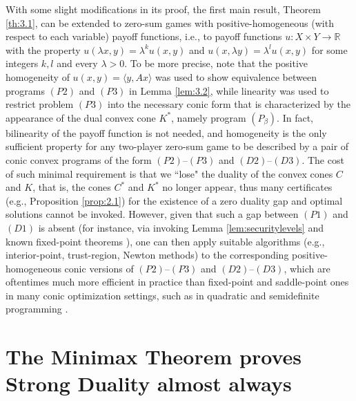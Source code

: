 \documentclass[11pt, twoside]{article}
\numberwithin{equation}{section}
\theoremstyle{definition}
\begin{document}
  With some slight modifications in its proof, the first main result, Theorem \ref{th:3.1}, can be extended to zero-sum games with positive-homogeneous (with respect to each variable) payoff functions, i.e., to payoff functions $u:X\times Y\to\mathbb{R}$ with the property $u(\lambda x, y)=\lambda^k u(x,y)$ and $u(x,\lambda y)=\lambda^l u(x,y)$ for some integers $k,l$ and every $\lambda>0$. To be more precise, note that the positive homogeneity of $u(x,y)=\langle y,Ax\rangle$ was used to show equivalence between programs \hyperlink{p2}{$(P2)$} and \hyperlink{p3}{$(P3)$} in Lemma \ref{lem:3.2}, while linearity was used to restrict problem \hyperlink{p3}{$(P3)$} into the necessary conic form that is characterized by the appearance of the dual convex cone $K^*$, namely program \hyperlink{primalbeta}{$(P_\beta)$}. In fact, bilinearity of the payoff function is not needed, and homogeneity is the only sufficient property for any two-player zero-sum game to be described by a pair of conic convex programs of the form \hyperlink{p2}{$(P2)$}--\hyperlink{p3}{$(P3)$} and \hyperlink{d2}{$(D2)$}--\hyperlink{d3}{$(D3)$}. The cost of such minimal requirement is that we ``lose" the duality of the convex cones $C$ and $K$, that is, the cones $C^*$ and $K^*$ no longer appear, thus many certificates (e.g., Proposition \ref{prop:2.1}) for the existence of a zero duality gap and optimal solutions cannot be invoked. However, given that such a gap between \hyperlink{p1}{$(P1)$} and \hyperlink{d1}{$(D1)$} is absent (for instance, via invoking Lemma \ref{lem:securitylevels} and known fixed-point theorems \cite{fan1952fixed, glicksberg1952further}), one can then apply suitable algorithms (e.g., interior-point, trust-region, Newton methods) to the corresponding positive-homogeneous conic versions of \hyperlink{p2}{$(P2)$}--\hyperlink{p3}{$(P3)$} and \hyperlink{d2}{$(D2)$}--\hyperlink{d3}{$(D3)$}, which are oftentimes much more efficient in practice than fixed-point and saddle-point ones in many conic optimization settings, such as in quadratic and semidefinite programming \cite{nesterov1994interior, nocedal1999numerical, wolkowicz2012handbook}.


\vspace{-0.1cm}\section{The Minimax Theorem proves Strong Duality almost always}\label{sec:4}\vspace{-0.2cm}
\end{document}
